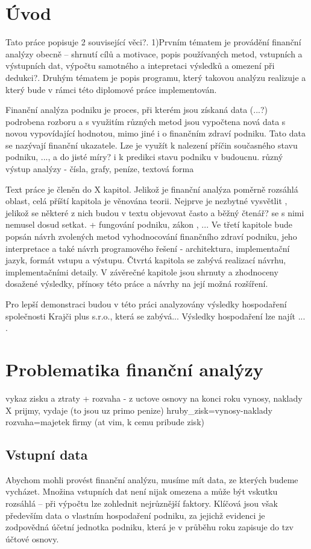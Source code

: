 \chapter{Úvod}
Tato práce popisuje 2 související věci?. 
1)Prvním tématem je provádění finanční analýzy obecně -- shrnutí cílů a motivace, popis používaných metod, vstupních a výstupních dat, výpočtu samotného a intepretaci výsledků a omezení při dedukci?. Druhým tématem je popis programu, který takovou analýzu realizuje a který bude v rámci této diplomové práce implementován.

Finanční analýza podniku je proces, při kterém jsou získaná data (...?) podrobena rozboru a s využitím různých metod jsou vypočtena nová data s novou vypovídající hodnotou, mimo jiné i o finančním zdraví podniku. Tato data se nazývají finanční ukazatele. Lze je využít k nalezení příčin současného stavu podniku, ..., a do jisté míry? i k predikci stavu podniku v budoucnu.
různý výstup analýzy - čísla, grafy, peníze, textová forma

Text práce je členěn do X kapitol. Jelikož je finanční analýza poměrně rozsáhlá oblast, celá příští kapitola je věnována teorii. Nejprve je nezbytné vysvětlit , jelikož se některé z nich budou v textu objevovat často a běžný čtenář? se s nimi nemusel dosud setkat. + fungování podniku, zákon , ...
Ve třetí kapitole bude popsán návrh zvolených metod vyhodnocování finančního zdraví podniku, jeho interpretace a také návrh programového řešení - architektura, implementační jazyk, formát vstupu a výstupu. Čtvrtá kapitola se zabývá realizací návrhu, implementačními detaily. V závěrečné kapitole jsou shrnuty a zhodnoceny dosažené výsledky, přínosy této práce a návrhy na její možná rozšíření.

Pro lepší demonstraci budou v této práci analyzovány výsledky hospodaření společnosti Krajči plus s.r.o., která se zabývá... Výsledky hospodaření lze najít ... .

\chapter{Problematika finanční analýzy}

vykaz zisku a ztraty + rozvaha - z uctove osnovy na konci roku
vynosy, naklady X prijmy, vydaje (to jsou uz primo penize)
hruby\_zisk=vynosy-naklady
rozvaha=majetek firmy (at vim, k cemu pribude zisk)

\section{Vstupní data}
Abychom mohli provést finanční analýzu, musíme mít data, ze kterých budeme vycházet. Množina vstupních dat není nijak omezena a může být vskutku rozsáhlá -- při výpočtu lze zohlednit nejrůznější faktory. Klíčová jsou však především data o vlastním hospodaření podniku, za jejichž evidenci je zodpovědná účetní jednotka podniku, která je v průběhu roku zapisuje do tzv účtové osnovy.
